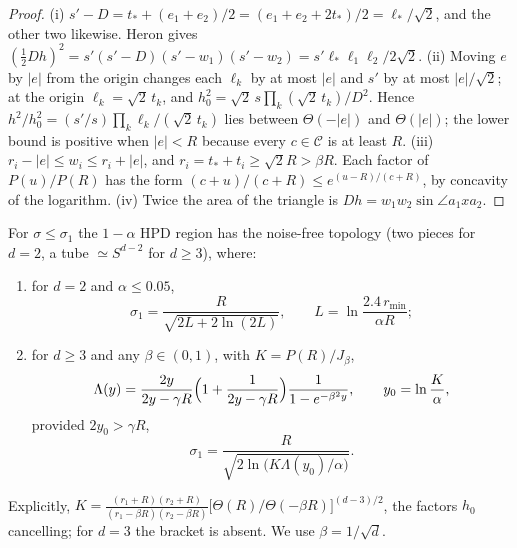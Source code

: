 \begin{proof}
(i) $s' - D = t_* + (e_1 + e_2)/2 = (e_1 + e_2 + 2t_*)/2 = \ell_*/\sqrt2$, and the other two likewise. Heron gives
$(\tfrac12 Dh)^2 = s'(s' - D)(s' - w_1)(s' - w_2) = s'\ell_*\ell_1\ell_2/2\sqrt2$. (ii) Moving $e$ by $|e|$ from the origin
changes each $\ell_k$ by at most $|e|$ and $s'$ by at most $|e|/\sqrt2$; at the origin $\ell_k = \sqrt2\,t_k$, and
$h_0^2 = \sqrt2\,s\prod_k(\sqrt2\,t_k)/D^2$. Hence $h^2/h_0^2 = (s'/s)\prod_k \ell_k/(\sqrt2\,t_k)$ lies between
$\Theta(-|e|)$ and $\Theta(|e|)$; the lower bound is positive when $|e| < R$ because every $c \in \mathcal C$ is at least $R$.
(iii) $r_i - |e| \le w_i \le r_i + |e|$, and $r_i = t_* + t_i \ge \sqrt2 R > \beta R$. Each factor of $P(u)/P(R)$ has the
form $(c + u)/(c + R) \le e^{(u - R)/(c + R)}$, by concavity of the logarithm. (iv) Twice the area of the triangle is
$Dh = w_1w_2\sin\angle a_1xa_2$.
\end{proof}

\begin{theorem}\label{thm:staircase}
For $\sigma \le \sigma_1$ the $1 - \alpha$ HPD region has the noise-free topology (two pieces for $d = 2$, a tube
$\simeq S^{d-2}$ for $d \ge 3$), where:
\begin{enumerate}[label=(\roman*)]
\item for $d = 2$ and $\alpha \le 0.05$,
\[ \sigma_1 = \frac{R}{\sqrt{2L + 2\ln(2L)}}, \qquad L = \ln\frac{2.4\,r_{\min}}{\alpha R}; \]
\item for $d \ge 3$ and any $\beta \in (0,1)$, with $K = P(R)/J_\beta$,
\[ \Lambda(y) = \frac{2y}{2y - \gamma R}\Bigl(1 + \frac{1}{2y - \gamma R}\Bigr)\frac{1}{1 - e^{-\beta^2 y}}, \qquad
   y_0 = \ln\frac{K}{\alpha}, \]
provided $2y_0 > \gamma R$,
\[ \sigma_1 = \frac{R}{\sqrt{2\ln\bigl(K\Lambda(y_0)/\alpha\bigr)}} . \]
\end{enumerate}
\end{theorem}

Explicitly, $K = \frac{(r_1 + R)(r_2 + R)}{(r_1 - \beta R)(r_2 - \beta R)}\bigl[\Theta(R)/\Theta(-\beta R)\bigr]^{(d-3)/2}$, the factors
$h_0$ cancelling; for $d = 3$ the bracket is absent. We use $\beta = 1/\sqrt d$.

